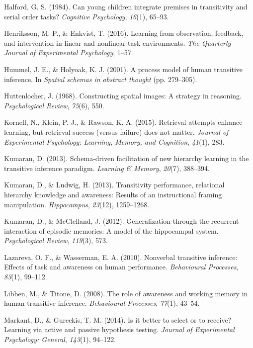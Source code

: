 \documentclass[floatsintext,man]{apa6}
\theoremstyle{definition}
\theoremstyle{definition}
\theoremstyle{definition}
\theoremstyle{remark}
\begin{document}
\hypertarget{ref-halford1984can}{}
Halford, G. S. (1984). Can young children integrate premises in
transitivity and serial order tasks? \emph{Cognitive Psychology},
\emph{16}(1), 65--93.

\hypertarget{ref-henriksson2016learning}{}
Henriksson, M. P., \& Enkvist, T. (2016). Learning from observation,
feedback, and intervention in linear and nonlinear task environments.
\emph{The Quarterly Journal of Experimental Psychology}, 1--57.

\hypertarget{ref-hummel2001process}{}
Hummel, J. E., \& Holyoak, K. J. (2001). A process model of human
transitive inference. In \emph{Spatial schemas in abstract thought} (pp.
279--305).

\hypertarget{ref-huttenlocher1968constructing}{}
Huttenlocher, J. (1968). Constructing spatial images: A strategy in
reasoning. \emph{Psychological Review}, \emph{75}(6), 550.

\hypertarget{ref-kornell2015retrieval}{}
Kornell, N., Klein, P. J., \& Rawson, K. A. (2015). Retrieval attempts
enhance learning, but retrieval success (versus failure) does not
matter. \emph{Journal of Experimental Psychology: Learning, Memory, and
Cognition}, \emph{41}(1), 283.

\hypertarget{ref-kumaran2013schema}{}
Kumaran, D. (2013). Schema-driven facilitation of new hierarchy learning
in the transitive inference paradigm. \emph{Learning \& Memory},
\emph{20}(7), 388--394.

\hypertarget{ref-kumaran2013transitivity}{}
Kumaran, D., \& Ludwig, H. (2013). Transitivity performance, relational
hierarchy knowledge and awareness: Results of an instructional framing
manipulation. \emph{Hippocampus}, \emph{23}(12), 1259--1268.

\hypertarget{ref-kumaran2012generalization}{}
Kumaran, D., \& McClelland, J. (2012). Generalization through the
recurrent interaction of episodic memories: A model of the hippocampal
system. \emph{Psychological Review}, \emph{119}(3), 573.

\hypertarget{ref-lazareva2010nonverbal}{}
Lazareva, O. F., \& Wasserman, E. A. (2010). Nonverbal transitive
inference: Effects of task and awareness on human performance.
\emph{Behavioural Processes}, \emph{83}(1), 99--112.

\hypertarget{ref-libben2008role}{}
Libben, M., \& Titone, D. (2008). The role of awareness and working
memory in human transitive inference. \emph{Behavioural Processes},
\emph{77}(1), 43--54.

\hypertarget{ref-markant2014select}{}
Markant, D., \& Gureckis, T. M. (2014). Is it better to select or to
receive? Learning via active and passive hypothesis testing.
\emph{Journal of Experimental Psychology: General}, \emph{143}(1),
94--122.
\end{document}
